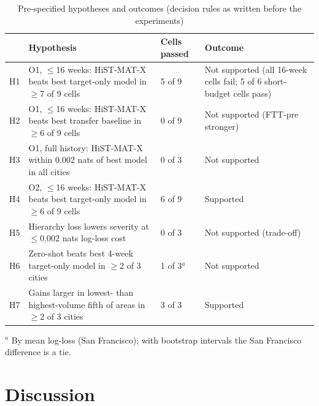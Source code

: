 \documentclass[11pt]{article}
\newcommand{\HMX}{HiST-MAT-X}
\begin{document}
\begin{table}[!htbp]
\centering
\caption{Pre-specified hypotheses and outcomes (decision rules as written before the experiments)}
\label{tab:hyp}
\scriptsize
\begin{tabular}{p{0.5cm}p{7.6cm}p{1.2cm}p{4.9cm}}
\toprule
 & Hypothesis & Cells passed & Outcome \\
\midrule
H1 & O1, $\le$16 weeks: \HMX{} beats best target-only model in $\ge$7 of 9 cells & 5 of 9 & Not supported (all 16-week cells fail; 5 of 6 short-budget cells pass) \\
H2 & O1, $\le$16 weeks: \HMX{} beats best transfer baseline in $\ge$6 of 9 cells & 0 of 9 & Not supported (FTT-pre stronger) \\
H3 & O1, full history: \HMX{} within 0.002 nats of best model in all cities & 0 of 3 & Not supported \\
H4 & O2, $\le$16 weeks: \HMX{} beats best target-only model in $\ge$6 of 9 cells & 6 of 9 & Supported \\
H5 & Hierarchy loss lowers severity at $\le$0.002 nats log-loss cost & 0 of 3 & Not supported (trade-off) \\
H6 & Zero-shot beats best 4-week target-only model in $\ge$2 of 3 cities & 1 of 3$^{a}$ & Not supported \\
H7 & Gains larger in lowest- than highest-volume fifth of areas in $\ge$2 of 3 cities & 3 of 3 & Supported \\
\bottomrule
\end{tabular}
\begin{flushleft}\footnotesize $^{a}$ By mean log-loss (San Francisco); with bootstrap intervals the San Francisco difference is a tie.\end{flushleft}
\end{table}

\FloatBarrier
\section{Discussion}\label{sec:discussion}
\end{document}
